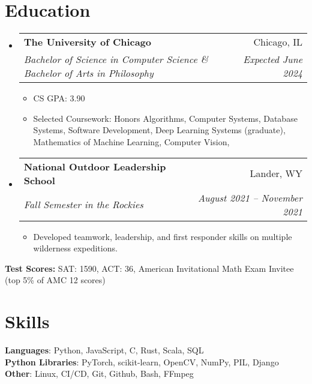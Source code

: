 \documentclass[letterpaper,11pt]{article}
\makeatletter
\newcommand{\resumeItem}[1]{
  \item\small{
    {#1 \vspace{-2pt}}
  }
}
\newcommand{\resumeSubheading}[4]{
  \vspace{-2pt}\item
    \begin{tabular*}{0.97\textwidth}[t]{l@{\extracolsep{\fill}}r}
      \textbf{#1} & #2 \\
      \textit{\small#3} & \textit{\small #4} \\
    \end{tabular*}\vspace{-7pt}
}
\newcommand{\resumeSubHeadingListStart}{\begin{itemize}[leftmargin=0.125in, label={}]}
\newcommand{\resumeSubHeadingListEnd}{\end{itemize}}
\newcommand{\resumeItemListStart}{\begin{itemize}[leftmargin=0.185in]
}
\newcommand{\resumeItemListEnd}{\end{itemize}\vspace{-5pt}}
\makeatother
\begin{document}
\section{Education}
  \resumeSubHeadingListStart
    \resumeSubheading
      {The University of Chicago}{Chicago, IL}
      {Bachelor of Science in Computer Science \& Bachelor of Arts in Philosophy}{Expected June 2024}
      \resumeItemListStart
        \resumeItem{CS GPA: 3.90}
        \resumeItem{{Selected Coursework:} 
        Honors Algorithms,
        Computer Systems,
        Database Systems,
        Software Development,
        Deep Learning Systems (graduate),
        Mathematics of Machine Learning,
        Computer Vision,
        }
      \resumeItemListEnd

    \resumeSubheading
      {National Outdoor Leadership School}{Lander, WY}
      {Fall Semester in the Rockies}{August 2021 -- November 2021}
      \resumeItemListStart
        \resumeItem{Developed teamwork, leadership, and first responder skills on multiple wilderness expeditions.}
      \resumeItemListEnd
  \resumeSubHeadingListEnd
  {
    \vspace{-4pt}
    \noindent\hspace{0.15in}\small\textbf{Test Scores:} SAT: 1590, ACT: 36, American Invitational Math Exam Invitee (top 5\% of AMC 12 scores)
    \vspace{-5pt}
    }
\section{Skills}
  \begin{itemize}[leftmargin=0.15in, label={}]
    \small{\item{
      \textbf{Languages}{:
      Python,
      JavaScript,
      C,
      Rust,
      Scala,
      SQL} \\
      \textbf{Python Libraries}{: 
      PyTorch,
      scikit-learn,
      OpenCV,
      NumPy,
      PIL,
      Django
      }
      \\
      \textbf{Other}{:
        Linux,
        CI/CD,
        Git, 
        Github,
        Bash,
        FFmpeg
        }}}
      {\vspace{-5pt}}
  \end{itemize}
\end{document}
